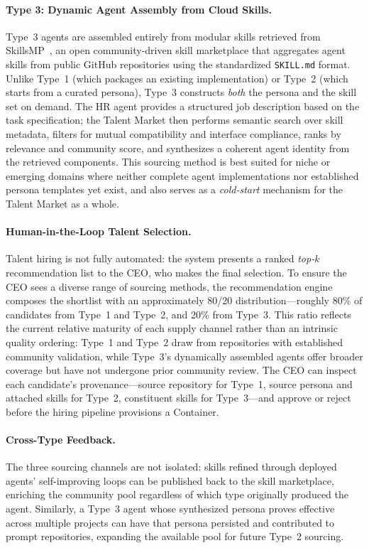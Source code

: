 \paragraph{Type 3: Dynamic Agent Assembly from Cloud Skills.}
Type~3 agents are assembled entirely from modular skills retrieved from SkillsMP~\cite{skillsmp}, an open community-driven skill marketplace that aggregates agent skills from public GitHub repositories using the standardized \texttt{SKILL.md} format. Unlike Type~1 (which packages an existing implementation) or Type~2 (which starts from a curated persona), Type~3 constructs \emph{both} the persona and the skill set on demand. The HR agent provides a structured job description based on the task specification; the Talent Market then performs semantic search over skill metadata, filters for mutual compatibility and interface compliance, ranks by relevance and community score, and synthesizes a coherent agent identity from the retrieved components. This sourcing method is best suited for niche or emerging domains where neither complete agent implementations nor established persona templates yet exist, and also serves as a \emph{cold-start} mechanism for the Talent Market as a whole.

\paragraph{Human-in-the-Loop Talent Selection.}
Talent hiring is not fully automated: the system presents a ranked \emph{top-$k$} recommendation list to the CEO, who makes the final selection. To ensure the CEO sees a diverse range of sourcing methods, the recommendation engine composes the shortlist with an approximately 80/20 distribution---roughly 80\% of candidates from Type~1 and Type~2, and 20\% from Type~3. This ratio reflects the current relative maturity of each supply channel rather than an intrinsic quality ordering: Type~1 and Type~2 draw from repositories with established community validation, while Type~3’s dynamically assembled agents offer broader coverage but have not undergone prior community review. The CEO can inspect each candidate’s provenance---source repository for Type~1, source persona and attached skills for Type~2, constituent skills for Type~3---and approve or reject before the hiring pipeline provisions a Container.

\paragraph{Cross-Type Feedback.}
The three sourcing channels are not isolated: skills refined through deployed agents’ self-improving loops can be published back to the skill marketplace, enriching the community pool regardless of which type originally produced the agent. Similarly, a Type~3 agent whose synthesized persona proves effective across multiple projects can have that persona persisted and contributed to prompt repositories, expanding the available pool for future Type~2 sourcing.


